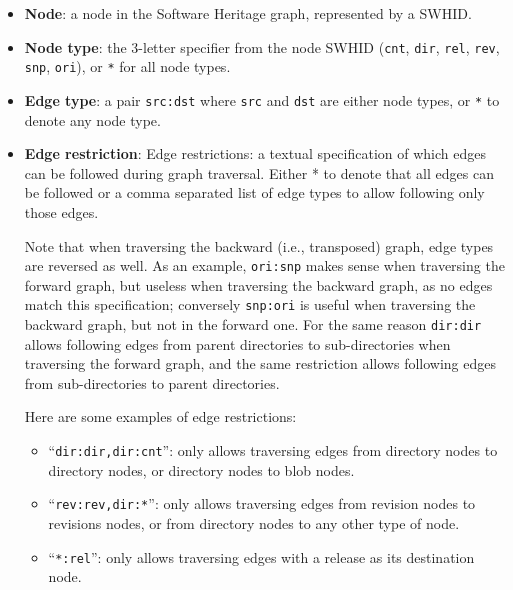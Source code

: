 \begin{itemize}
    \item \textbf{Node}: a node in the Software Heritage graph, represented by
        a \gls{SWHID}.
    \item \textbf{Node type}: the 3-letter specifier from the node \gls{SWHID}
        (\texttt{cnt}, \texttt{dir}, \texttt{rel}, \texttt{rev}, \texttt{snp},
        \texttt{ori}), or \texttt{*} for all node types.
    \item \textbf{Edge type}: a pair \texttt{src:dst} where \texttt{src} and
        \texttt{dst} are either node types, or \texttt{*} to denote any node
        type.
    \item \textbf{Edge restriction}: Edge restrictions: a textual specification
        of which edges can be followed during graph traversal. Either * to
        denote that all edges can be followed or a comma separated list of edge
        types to allow following only those edges.

        Note that when traversing the backward (i.e., transposed) graph, edge
        types are reversed as well. As an example, \texttt{ori:snp} makes
        sense when traversing the forward graph, but useless when traversing
        the backward graph, as no edges match this specification; conversely
        \texttt{snp:ori} is useful when traversing the backward graph, but not
        in the forward one. For the same reason \texttt{dir:dir} allows
        following edges from parent directories to sub-directories when
        traversing the forward graph, and the same restriction allows following
        edges from sub-directories to parent directories.

        Here are some examples of edge restrictions:

        \begin{itemize}
            \item ``\texttt{dir:dir,dir:cnt}'': only allows traversing edges
                from directory nodes to directory nodes, or directory nodes to
                blob nodes.

            \item ``\texttt{rev:rev,dir:*}'': only allows traversing edges from
                revision nodes to revisions nodes, or from directory nodes to
                any other type of node.

            \item ``\texttt{*:rel}'': only allows traversing edges with a
                release as its destination node.
        \end{itemize}
\end{itemize}

